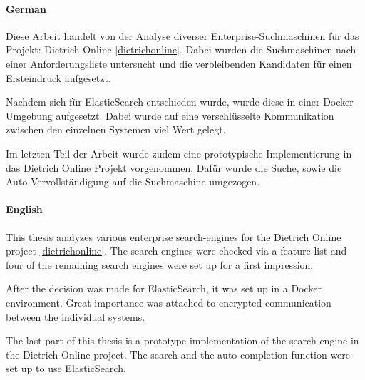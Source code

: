 \kurzfassung

\paragraph*{German}
Diese Arbeit handelt von der Analyse diverser Enterprise-Suchmaschinen für das Projekt: Dietrich Online \ref{dietrichonline}. Dabei wurden die Suchmaschinen nach einer Anforderungsliste untersucht und die verbleibenden Kandidaten für einen Ersteindruck aufgesetzt. 

Nachdem sich für ElasticSearch entschieden wurde, wurde diese in einer Docker-Umgebung aufgesetzt. Dabei wurde auf eine verschlüsselte Kommunikation zwischen den einzelnen Systemen viel Wert gelegt.

Im letzten Teil der Arbeit wurde zudem eine prototypische Implementierung in das Dietrich Online Projekt vorgenommen. Dafür wurde die Suche, sowie die Auto-Vervollständigung auf die Suchmaschine umgezogen.

\paragraph*{English}

This thesis analyzes various enterprise search-engines for the Dietrich Online project \ref{dietrichonline}. The search-engines were checked via a feature list and four of the remaining search engines were set up for a first impression.

After the decision was made for ElasticSearch, it was set up in a Docker environment. Great importance was attached to encrypted communication between the individual systems.

The last part of this thesis is a prototype implementation of the search engine in the Dietrich-Online project. The search and the auto-completion function were set up to use ElasticSearch.